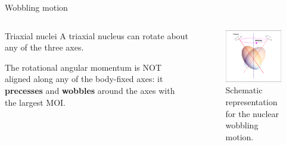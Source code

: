 \documentclass{beamer}
\begin{document}
\begin{frame}{Wobbling motion}
  \begin{columns}
    \begin{column}{0.47\textwidth}
    \begin{block}{Triaxial nuclei}
        A triaxial nucleus can rotate about any of the three axes.
        
        \vspace{0.3cm}
        
        The rotational angular momentum is NOT aligned along any of the body-fixed axes: it \textbf{precesses} and \textbf{wobbles} around the axes with the largest MOI. 
    \end{block}
    \end{column}
    \begin{column}{0.53\textwidth}  %
         \begin{figure}
          \centering
          \includegraphics[scale=0.35]{figs/wobbling_drawing.png}
          \caption{Schematic representation for the nuclear wobbling motion.}
          \label{wobbling_picture}
      \end{figure}
  
    \end{column}
    \end{columns}
\end{frame}
\end{document}
